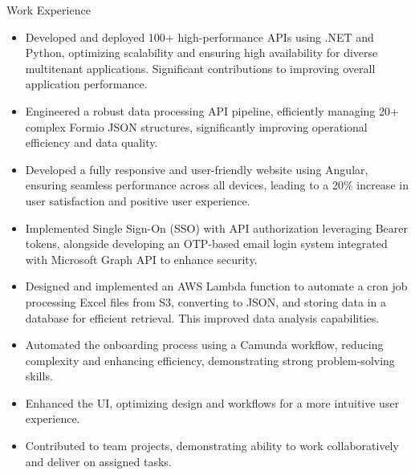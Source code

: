 \documentclass{resume}
\begin{document}
\begin{experienceSection}{Work Experience}
    \experienceItem[
        company={EXL Digital},
        location={Noida Sec-144},
        position={FullStack Developer},
        duration={Aug 2023 -- Present}
    ]
    \begin{itemize}
        \itemsep -6pt
        \item Developed and deployed 100+ high-performance APIs using .NET and Python, optimizing scalability and ensuring high availability for diverse multitenant applications. Significant contributions to improving overall application performance.
        \item Engineered a robust data processing API pipeline, efficiently managing 20+ complex Formio JSON structures, significantly improving operational efficiency and data quality.
        \item Developed a fully responsive and user-friendly website using Angular, ensuring seamless performance across all devices, leading to a 20\% increase in user satisfaction and positive user experience.
        \item Implemented Single Sign-On (SSO) with API authorization leveraging Bearer tokens, alongside developing an OTP-based email login system integrated with Microsoft Graph API to enhance security.
        \item Designed and implemented an AWS Lambda function to automate a cron job processing Excel files from S3, converting to JSON, and storing data in a database for efficient retrieval. This improved data analysis capabilities.
        \item Automated the onboarding process using a Camunda workflow, reducing complexity and enhancing efficiency, demonstrating strong problem-solving skills.
    \end{itemize}
    \experienceItem[
        company={Nokia},
        location={Chennai},
        position={Web Developer Intern},
        duration={Jun 2018 -- Jul 2018}
    ]
    \begin{itemize}
        \itemsep -6pt
        \item Enhanced the UI, optimizing design and workflows for a more intuitive user experience.
        \item Contributed to team projects, demonstrating ability to work collaboratively and deliver on assigned tasks.
    \end{itemize}
\end{experienceSection}
\end{document}
